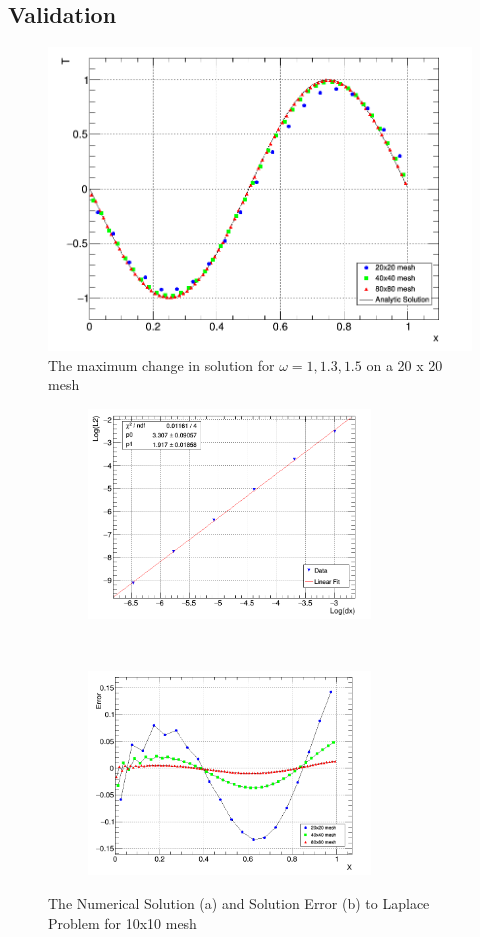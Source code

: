 \documentclass[paper=a4, fontsize=11pt, abstract=on]{scrartcl}
\numberwithin{equation}{section}		%
\numberwithin{figure}{section}			%
\numberwithin{table}{section}				%
\begin{document}
\subsection{Validation}


\begin{figure}[H]
\centering
\includegraphics[width=0.75\linewidth]{qq11}
\caption{The maximum change in solution for $\omega = 1, 1.3, 1.5$ on a 20 x 20 mesh}
\label{q4}
\end{figure}

\begin{figure}[H]
        \centering
        \begin{subfigure}[h]{0.5\textwidth}
                \includegraphics[width = 7.5cm]{order}
                \caption{}
				
        \end{subfigure}%
       ~~~~~
        \begin{subfigure}[h]{0.5\textwidth}
                \includegraphics[width = 7.5cm]{qq22}
                \caption{}
                
        \end{subfigure}
        \caption{The Numerical Solution (a) and Solution Error (b) to Laplace Problem for 10x10 mesh  }
        \label{3d}
\end{figure}
\end{document}
